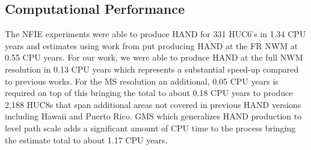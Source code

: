 \subsection{Computational Performance}
\label{ssec:compuational_performance}
%
The NFIE experiments were able to produce HAND for 331 HUC6's in 1.34 CPU years \cite{liu2016cybergis} and estimates using work from  put producing HAND at the FR NWM at 0.55 CPU years. 
For our work, we were able to produce HAND at the full NWM resolution in 0.13 CPU years which represents a substantial speed-up compared to previous works.
For the MS resolution an additional, 0.05 CPU years is required on top of this bringing the total to about 0.18 CPU years to produce 2,188 HUC8s that span additional areas not covered in previous HAND versions including Hawaii and Puerto Rico.
GMS which generalizes HAND production to level path scale adds a significant amount of CPU time to the process bringing the estimate total to about 1.17 CPU years.
%
